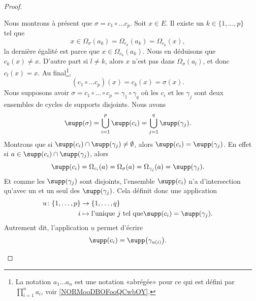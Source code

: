 \begin{proof}
\begin{subproof}
		Nous montrons à présent que \( \sigma=c_1\circ\ldots c_p\). Soit \( x\in E\). Il existe un \( k\in\{1,\ldots, p \}\) tel que
		\begin{equation}
			x\in \Omega_{\sigma}(a_k)=\Omega_{c_k}(a_k)=\Omega_{c_k}(x),
		\end{equation}
		la dernière égalité est parce que \( x\in \Omega_{c_k}(a_k)\). Nous en déduisons que \( c_k(x)\neq x\). D'autre part si \( l\neq k\), alors \( x\) n'est pas dans \( \Omega_{\sigma}(a_l)\), et donc \( c_l(x)=x\). Au final\footnote{La notation \( a_1\ldots a_n\) est une notation «abrégée» pour ce qui est défini par \( \prod_{i=1}^na_i\), voir \ref{NORMooDBOFooQCwbOY}.},
		\begin{equation}
			(c_1\circ\ldots c_p)(x)=c_k(x)=\sigma(x).
		\end{equation}
		\spitem[Unicité]
		Nous supposons avoir \( \sigma=c_1\circ\ldots\circ c_p=\gamma_1\circ\gamma_q\) où les \(  c_i\) et les \( \gamma_j\) sont deux ensembles de cycles de supports disjoints. Nous avons
		\begin{equation}
			\supp(\sigma)=\bigcup_{i=1}^p\supp(c_i)=\bigcup_{j=1}^q\supp(\gamma_j).
		\end{equation}
		Montrons que si \( \supp(c_i)\cap\supp(\gamma_j)\neq \emptyset\), alors \( \supp(c_i)=\supp(\gamma_j)\). En effet si \( a\in\supp(c_i)\cap\supp(\gamma_j)\), alors
		\begin{equation}
			\supp(c_i)=\Omega_{c_i}(a)=\Omega_{\sigma}(a)=\Omega_{\gamma_j}(a)=\supp(\gamma_j).
		\end{equation}
		Et comme les \( \supp(\gamma_j)\) sont disjoints, l'ensemble \( \supp(c_i)\) n'a d'intersection qu'avec un et un seul des \( \supp(\gamma_j)\). Cela définit donc une application
		\begin{equation}
			\begin{aligned}
				u\colon \{ 1,\ldots, p \} & \to \{ 1,\ldots, q \}                                              \\
				i                         & \mapsto \text{l'unique \( j\) tel que} \supp(c_i)=\supp(\gamma_j).
			\end{aligned}
		\end{equation}
		Autrement dit, l'application \( u\) permet d'écrire
		\begin{equation}
			\supp(c_i)=\supp\big( \gamma_{u(i)} \big).
		\end{equation}


\end{subproof}
\end{proof}
